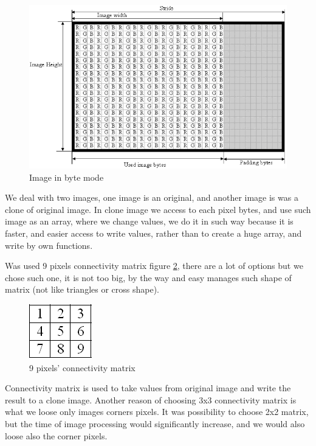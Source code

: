 \begin{figure}[H]
  \centering
  \includegraphics[scale= 0.6]{source/imagebyte.png}
  \caption{Image in byte mode}
  \label{fig:imagebyte}
\end{figure}

We deal with two images, one image is an original, and another image is was a clone of original image. In clone image we access to each pixel bytes, and use such image as an array, where we change values, we do it in such way because it is faster, and easier access to write values, rather than to create a huge array, and write by own functions.

 Was used 9 pixels connectivity matrix figure  \ref{fig:pixelmatrix}, there are a lot of options but we chose such one, it is not too big, by the way and easy manages such shape of matrix (not like triangles or cross shape).  

\begin{figure}[H]
  \centering
  \includegraphics[scale= 0.6]{source/pixelmatrix.png}
  \caption{9 pixels’ connectivity matrix}
  \label{fig:pixelmatrix}
\end{figure}

Connectivity matrix is used to take values from original image and write the result to a clone image. Another reason of choosing 3x3 connectivity matrix is what we loose only images corners pixels. It was possibility to choose 2x2 matrix, but the time of image processing would significantly increase, and we would also loose also the corner pixels.

